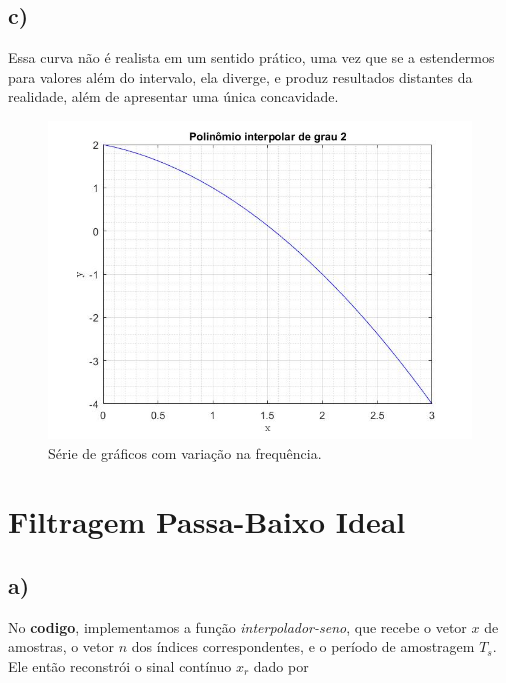 \documentclass[a4paper, 12pt]{article}
\begin{document}
\subsection{c)}

Essa curva não é realista em um sentido prático, uma vez que se a estendermos para valores além do intervalo, ela diverge, e produz resultados distantes da realidade, além de apresentar uma única concavidade.



\begin{figure}[H]
	\centering
	\includegraphics[scale=0.5]{../Imagens/ex5/c.jpg} 
	\caption{Série de gráficos com variação na frequência.}
	\label{fig:5c}
\end{figure}

\section{Filtragem Passa-Baixo Ideal}

\subsection{a)}

No \textbf{codigo}, implementamos a função \textit{interpolador-seno}, que recebe o vetor $x$ de amostras, o vetor $n$ dos índices correspondentes, e o período de amostragem $T_s$. Ele então reconstrói o sinal contínuo $x_r$ dado por
\end{document}
